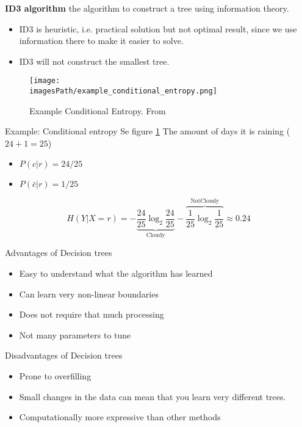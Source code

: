 \begin{multicols}{2}
\textbf{ID3 algorithm} the algorithm to construct a tree using information
theory.
\begin{itemize}
    \item ID3 is heuristic, i.e. practical solution but not optimal result, since we use information there to make it easier to solve.
    \item ID3 will not construct the smallest tree.
\end{itemize}

\begin{figure}[H]
    \centering
    \texttt{[image: \\imagesPath/example\_conditional\_entropy.png]}
    \caption{Example Conditional Entropy. From \cite{iml}}
    \label{fig:example_conditional_entropy}
\end{figure}
\begin{exampleblock}{Example: Conditional entropy}
    Se figure \ref{fig:example_conditional_entropy}
    The amount of days it is raining ($24+1=25$)
    \begin{itemize}
        \item $P(c|r) = 24/25$
        \item $P(\bar{c}|r) = 1/25$ 
    \end{itemize}
    
    \begin{equation*}
        H(Y|X=r) = -\underbrace{\frac{24}{25}\log_2\frac{24}{25}}_{\text{Cloudy}} - \overbrace{\frac{1}{25}\log_2\frac{1}{25}}^{\text{NotCloudy}} \approx 0.24
    \end{equation*}
\end{exampleblock}

Advantages of Decision trees
\begin{itemize}
    \item Easy to understand what the algorithm has learned 
    \item Can learn very non-linear boundaries
    \item Does not require that much processing
    \item Not many parameters to tune 
\end{itemize}

Disadvantages of Decision trees
\begin{itemize}
    \item Prone to overfilling 
    \item Small changes in the data can mean that you learn very different trees.
    \item Computationally more expressive than other methods
\end{itemize}


\end{multicols}
